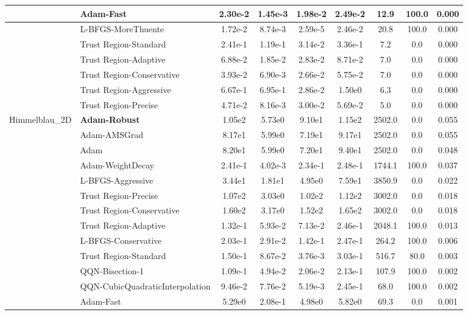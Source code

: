 \documentclass{article}
\begin{document}
\begin{longtable}{|l|l|c|c|c|c|c|c|c|}
\hline
 & Adam-Fast & 2.30e-2 & 1.45e-3 & 1.98e-2 & 2.49e-2 & 12.9 & 100.0 & 0.000 \\
\hline
 & L-BFGS-MoreThuente & 1.72e-2 & 8.74e-3 & 2.59e-5 & 2.46e-2 & 20.8 & 100.0 & 0.000 \\
\hline
 & Trust Region-Standard & 2.41e-1 & 1.19e-1 & 3.14e-2 & 3.36e-1 & 7.2 & 0.0 & 0.000 \\
\hline
 & Trust Region-Adaptive & 6.88e-2 & 1.85e-2 & 2.83e-2 & 8.71e-2 & 7.0 & 0.0 & 0.000 \\
\hline
 & Trust Region-Conservative & 3.93e-2 & 6.90e-3 & 2.66e-2 & 5.75e-2 & 7.0 & 0.0 & 0.000 \\
\hline
 & Trust Region-Aggressive & 6.67e-1 & 6.95e-1 & 2.86e-2 & 1.50e0 & 6.3 & 0.0 & 0.000 \\
\hline
 & Trust Region-Precise & 4.71e-2 & 8.16e-3 & 3.00e-2 & 5.69e-2 & 5.0 & 0.0 & 0.000 \\
Himmelblau\_2D & \textbf{Adam-Robust} & 1.05e2 & 5.73e0 & 9.10e1 & 1.15e2 & 2502.0 & 0.0 & 0.055 \\
\hline
 & Adam-AMSGrad & 8.17e1 & 5.99e0 & 7.19e1 & 9.17e1 & 2502.0 & 0.0 & 0.055 \\
\hline
 & Adam & 8.20e1 & 5.99e0 & 7.20e1 & 9.40e1 & 2502.0 & 0.0 & 0.048 \\
\hline
 & Adam-WeightDecay & 2.41e-1 & 4.02e-3 & 2.34e-1 & 2.48e-1 & 1744.1 & 100.0 & 0.037 \\
\hline
 & L-BFGS-Aggressive & 3.44e1 & 1.81e1 & 4.95e0 & 7.59e1 & 3850.9 & 0.0 & 0.022 \\
\hline
 & Trust Region-Precise & 1.07e2 & 3.03e0 & 1.02e2 & 1.12e2 & 3002.0 & 0.0 & 0.018 \\
\hline
 & Trust Region-Conservative & 1.60e2 & 3.17e0 & 1.52e2 & 1.65e2 & 3002.0 & 0.0 & 0.018 \\
\hline
 & Trust Region-Adaptive & 1.32e-1 & 5.93e-2 & 7.13e-2 & 2.46e-1 & 2048.1 & 100.0 & 0.013 \\
\hline
 & L-BFGS-Conservative & 2.03e-1 & 2.91e-2 & 1.42e-1 & 2.47e-1 & 264.2 & 100.0 & 0.006 \\
\hline
 & Trust Region-Standard & 1.50e-1 & 8.67e-2 & 3.76e-3 & 3.03e-1 & 516.7 & 80.0 & 0.003 \\
\hline
 & QQN-Bisection-1 & 1.09e-1 & 4.94e-2 & 2.06e-2 & 2.13e-1 & 107.9 & 100.0 & 0.002 \\
\hline
 & QQN-CubicQuadraticInterpolation & 9.46e-2 & 7.76e-2 & 5.19e-3 & 2.45e-1 & 68.0 & 100.0 & 0.002 \\
\hline
 & Adam-Fast & 5.29e0 & 2.08e-1 & 4.98e0 & 5.82e0 & 69.3 & 0.0 & 0.001 \\

\end{longtable}
\end{document}
